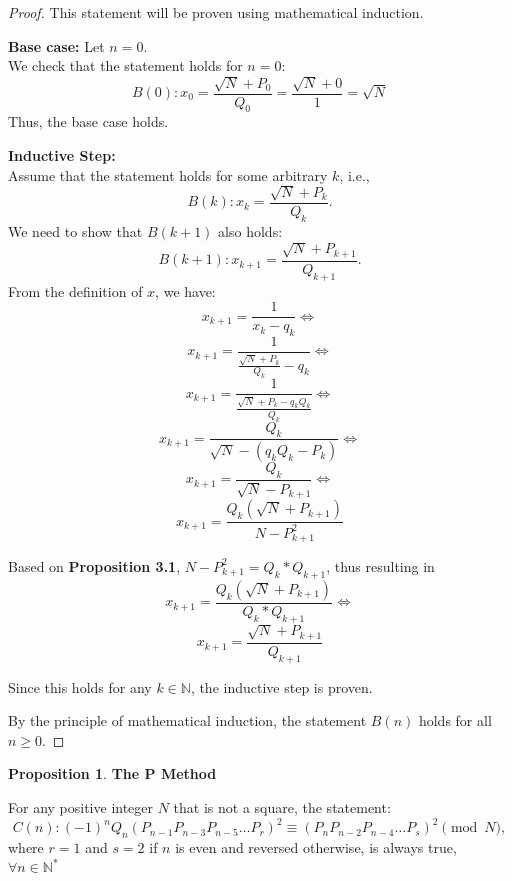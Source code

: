 \documentclass[12pt]{article}
\theoremstyle{definition}
\newtheorem{proposition}[theorem]{Proposition}
\begin{document}
\begin{proof}

This statement will be proven using mathematical induction.

\textbf{Base case:} Let \(n = 0\). \\
We check that the statement holds for \(n = 0\):
\[
B(0): x_0 = \frac{\sqrt{N} + P_0}{Q_0} = \frac{\sqrt{N} + 0}{1}=\sqrt{N}
\]
Thus, the base case holds.

\vspace{1em}

\textbf{Inductive Step:} \\
Assume that the statement holds for some arbitrary \(k\), i.e.,
\[
B(k): x_k = \frac{\sqrt{N} + P_k}{Q_k}.
\]
We need to show that \(B(k + 1)\) also holds:
\[
B(k + 1): x_{k + 1} = \frac{\sqrt{N} + P_{k + 1}}{Q_{k + 1}}.
\]
From the definition of $x$, we have:
\[
x_{k + 1} = \frac{1}{x_k-q_k} \Longleftrightarrow
\]
\[
x_{k + 1} = \frac{1}{\frac{\sqrt{N} + P_k}{Q_k}-q_k} \Longleftrightarrow
\]
\[
x_{k + 1} = \frac{1}{\frac{\sqrt{N} + P_k - q_k Q_k}{Q_k}} \Longleftrightarrow
\]
\[
x_{k + 1} = \frac{Q_k}{\sqrt{N} - (q_k Q_k - P_k)} \Longleftrightarrow
\]
\[
x_{k + 1} = \frac{Q_k}{\sqrt{N} - P_{k+1}} \Longleftrightarrow
\]
\[
x_{k + 1} = \frac{Q_k(\sqrt{N} + P_{k+1})}{N-P_{k+1}^2}
\]

Based on \textbf{Proposition 3.1}, $N-P_{k+1}^2 = Q_k * Q_{k + 1}$, thus resulting in
\[
x_{k + 1} = \frac{Q_k(\sqrt{N} + P_{k+1})}{Q_k * Q_{k + 1}} \Longleftrightarrow
\]
\[
x_{k + 1} = \frac{\sqrt{N} + P_{k+1}}{Q_{k + 1}}
\]


Since this holds for any \(k \in \mathbb{N}\), the inductive step is proven.

\vspace{1em}

By the principle of mathematical induction, the statement \(B(n)\) holds for all \(n \geq 0\).
\end{proof}

\begin{proposition}
\textbf{The P Method}

    For any positive integer $N$ that is not a square, the statement:
    \begin{equation}
        C(n): (-1)^nQ_n(P_{n-1}P_{n-3}P_{n-5}\ldots P_r)^2 \equiv (P_nP_{n-2}P_{n-4} \ldots P_s) ^2 \pmod N,
    \end{equation}
    where $r = 1$ and $s = 2$ if $n$ is even and reversed otherwise, is always true, $\forall n \in \mathbb{N^*}$
\end{proposition}
\end{document}
